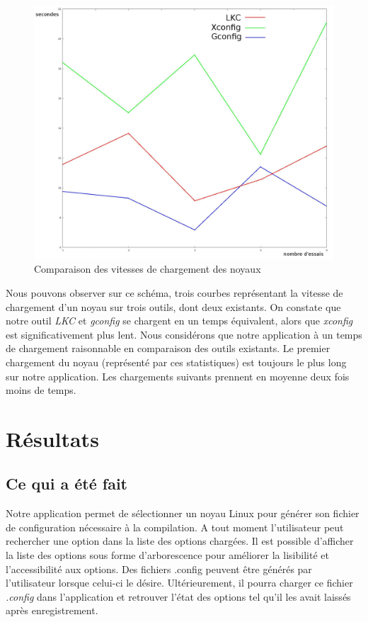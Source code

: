 \documentclass[17pts]{report}
\begin{document}
\begin{figure}[H]
    \includegraphics[scale=0.4]{./illustrations/speed_cmp.jpeg}
    \centering
    \caption{Comparaison des vitesses de chargement des noyaux}
    \label{fig:VitesseChargement}
\end{figure}
Nous pouvons observer sur ce schéma, trois courbes représentant la vitesse
de chargement d'un noyau sur trois outils, dont deux existants.
On constate que notre outil \textit{LKC} et \textit{gconfig} se chargent en un
temps équivalent, alors que \textit{xconfig} est significativement plus lent.
Nous considérons que notre application à un temps de chargement raisonnable
en comparaison des outils existants. Le premier chargement du noyau (représenté
par ces statistiques) est toujours le plus long sur notre application. Les
chargements suivants prennent en moyenne deux fois moins de temps.

\chapter{Résultats}\thispagestyle{IHA-fancy-style}
\label{cha:Résultats}
\section{Ce qui a été fait}
\label{sec:Ce qui a été fait}

Notre application permet de sélectionner un noyau Linux pour générer son
fichier de configuration nécessaire à la compilation. A tout moment
l'utilisateur peut rechercher une option dans la liste des options chargées. Il
est possible d'afficher la liste des options sous forme d'arborescence pour
améliorer la lisibilité et l'accessibilité aux options. Des fichiers .config
peuvent être générés par l'utilisateur lorsque celui-ci le désire.
Ultérieurement, il pourra charger ce fichier \textit{.config} dans
l'application et retrouver l'état des options tel qu'il les avait laissés après
enregistrement.\\
\end{document}
